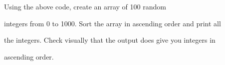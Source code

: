 Using the above code, create an array of 100 random

integers from 0 to 1000. Sort the array in ascending order and print all

the integers. Check visually that the output does give you integers in

ascending order.

